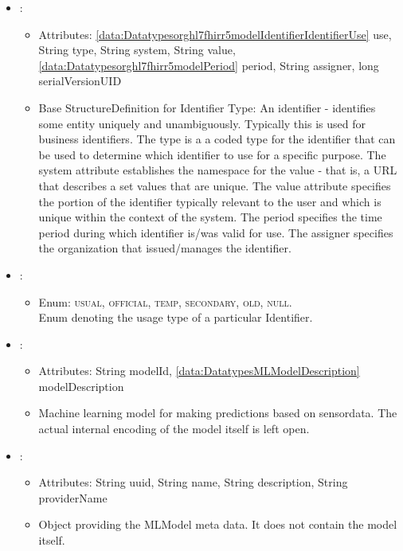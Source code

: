 \begin{itemize}[nolistsep,noitemsep]
\item {}: 
\begin{itemize}[noitemsep,nolistsep]
\item[] Attributes: \ref{data:Datatypesorghl7fhirr5modelIdentifierIdentifierUse} use, String type, String system, String value, \ref{data:Datatypesorghl7fhirr5modelPeriod} period, String assigner, long serialVersionUID
\item[] Base StructureDefinition for Identifier Type: An identifier - identifies some entity uniquely and unambiguously. Typically this is used for business identifiers.
The type is a a coded type for the identifier that can be used to determine which identifier to use for a specific purpose.
The system attribute establishes the namespace for the value - that is, a URL that describes a set values that are unique.
The value attribute specifies the portion of the identifier typically relevant to the user and which is unique within the context of the system.
The period specifies the time period during which identifier is/was valid for use.
The assigner specifies the organization that issued/manages the identifier.
\end{itemize}

\item {}: 
\begin{itemize}[noitemsep,nolistsep]

\item[] Enum: \textsc{usual}, \textsc{official}, \textsc{temp}, \textsc{secondary}, \textsc{old}, \textsc{null}.\\Enum denoting the usage type of a particular Identifier.
\end{itemize}

\item {}: 
\begin{itemize}[noitemsep,nolistsep]
\item[] Attributes: String modelId, \ref{data:DatatypesMLModelDescription} modelDescription
\item[] Machine learning model for making predictions based on sensordata.
The actual internal encoding of the model itself is left open.
\end{itemize}

\item {}: 
\begin{itemize}[noitemsep,nolistsep]
\item[] Attributes: String uuid, String name, String description, String providerName
\item[] Object providing the MLModel meta data. It does not contain the model itself.
\end{itemize}


\end{itemize}
